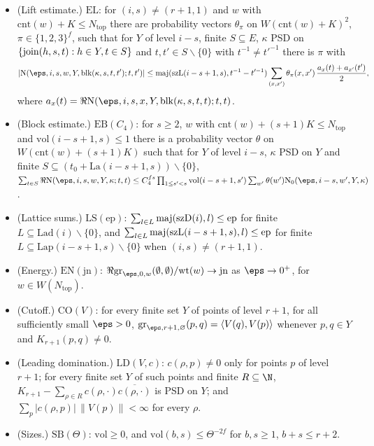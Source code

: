 \begin{definition}
\begin{itemize}
$\sum_{t\in S}\Re\thmSNst(\eps,i,1,w,Y,\kappa;t,t)\le|\thmSNh(\eps,i,w,Y,\kappa,0)|+B$ for every finite
$S\subseteq(t_0+\mathrm{La}(i,1))\smallsetminus\{0\}$.
\item (Lift estimate.) $\mathrm{EL}$: for $(i,s)\ne(r+1,1)$ and $w$ with $\mathrm{cnt}(w)+K\le N_{\mathrm{top}}$ there are
probability vectors $\theta_\pi$ on $W(\mathrm{cnt}(w)+K)^2$, $\pi\in\{1,2,3\}^f$, such that for $Y$ of level $i-s$,
finite $S\subseteq E$, $\kappa$ PSD on $\{\operatorname{join}(h,s,t):h\in Y,t\in S\}$ and $t,t'\in S\smallsetminus\{0\}$ with
$t^{-1}\ne t'^{-1}$ there is $\pi$ with
\[
|\thmSNst(\eps,i,s,w,Y,\thmSblk(\kappa,s,t,t');t,t')|\le\thmSmaj(\mathrm{szL}(i-s+1,s),t^{-1}-t'^{-1})
\sum_{(x,x')}\theta_\pi(x,x')\,\frac{a_x(t)+a_{x'}(t')}2,
\]
where $a_x(t)=\Re\thmSNst(\eps,i,s,x,Y,\thmSblk(\kappa,s,t,t);t,t)$.
\item (Block estimate.) $\mathrm{EB}(C_4)$: for $s\ge2$, $w$ with $\mathrm{cnt}(w)+(s+1)K\le N_{\mathrm{top}}$ and
$\mathrm{vol}(i-s+1,s)\le1$ there is a probability vector $\theta$ on $W(\mathrm{cnt}(w)+(s+1)K)$ such that for $Y$ of
level $i-s$, $\kappa$ PSD on $Y$ and finite $S\subseteq(t_0+\mathrm{La}(i-s+1,s))\smallsetminus\{0\}$,
$\sum_{t\in S}\Re\thmSNst(\eps,i,s,w,Y,\kappa;t,t)\le C_4^{fs}\prod_{1\le s'<s}\mathrm{vol}(i-s+1,s')
\sum_{w'}\theta(w')\thmSNz(\eps,i-s,w',Y,\kappa)$.
\item (Lattice sums.) $\mathrm{LS}(\mathrm{ep})$: $\sum_{l\in L}\operatorname{maj}(\mathrm{szD}(i),l)\le\mathrm{ep}$ for finite
$L\subseteq\mathrm{Lad}(i)\smallsetminus\{0\}$, and $\sum_{l\in L}\operatorname{maj}(\mathrm{szL}(i-s+1,s),l)\le\mathrm{ep}$ for finite
$L\subseteq\mathrm{Lap}(i-s+1,s)\smallsetminus\{0\}$ when $(i,s)\ne(r+1,1)$.
\item (Energy.) $\mathrm{EN}(\mathrm{jn})$: $\Re\thmSgram_{\eps,0,w}(\emptyset,\emptyset)/\mathrm{wt}(w)\to\mathrm{jn}$ as
$\eps\to0^+$, for $w\in W(N_{\mathrm{top}})$.
\item (Cutoff.) $\mathrm{CO}(V)$: for every finite set $Y$ of points of level $r+1$, for all sufficiently small $\eps>0$,
$\thmSgram_{\eps,r+1,\varnothing}(p,q)=\langle V(q),V(p)\rangle$ whenever $p,q\in Y$ and $K_{r+1}(p,q)\ne0$.
\item (Leading domination.) $\mathrm{LD}(V,c)$: $c(\rho,p)\ne0$ only for points $p$ of level $r+1$; for every finite set $Y$
of such points and finite $R\subseteq\N$, $K_{r+1}-\sum_{\rho\in R}c(\rho,\cdot)\overline{c(\rho,\cdot)}$ is PSD on $Y$;
and $\sum_p|c(\rho,p)|\,\|V(p)\|<\infty$ for every $\rho$.
\item (Sizes.) $\mathrm{SB}(\Theta)$: $\mathrm{vol}\ge0$, and $\mathrm{vol}(b,s)\le\Theta^{-2f}$ for $b,s\ge1$, $b+s\le r+2$.
\end{itemize}
\end{definition}

